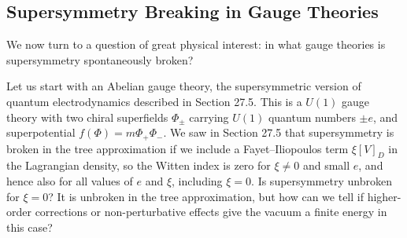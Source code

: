 
\subsection{Supersymmetry Breaking in Gauge Theories}

We now turn to a question of great physical interest: in what gauge
theories is supersymmetry spontaneously broken?

Let us start with an Abelian gauge theory, the supersymmetric version of
quantum electrodynamics described in Section 27.5. This is a \(U(1)\) gauge
theory with two chiral superfields \(\Phi_\pm\) carrying \(U(1)\) quantum
numbers \(\pm e\), and superpotential
\(f(\Phi)=m\Phi_+\Phi_-\). We saw in Section 27.5 that supersymmetry is
broken in the tree approximation if we include a Fayet--Iliopoulos term
\(\xi[V]_D\) in the Lagrangian density, so the Witten index is zero for
\(\xi\neq0\) and small \(e\), and hence also for all values of \(e\) and
\(\xi\), including \(\xi=0\). Is supersymmetry unbroken for \(\xi=0\)?
It is unbroken in the tree approximation, but how can we tell if
higher-order corrections or non-perturbative effects give the vacuum a
finite energy in this case?

